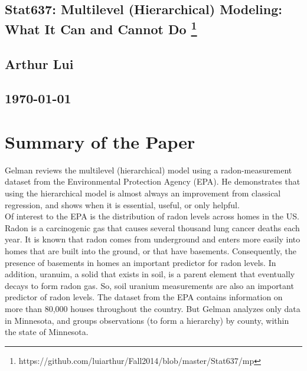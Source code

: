 \documentclass{article}
\begin{document}
\begin{center}
  \section*{\textbf{Stat637: Multilevel (Hierarchical) Modeling: What It Can and Cannot Do}
    \footnote{https://github.com/luiarthur/Fall2014/blob/master/Stat637/mp}
  }  
  \subsection*{\textbf{Arthur Lui}}
  \subsection*{\noindent\today}
\end{center}

\section{Summary of the Paper}
Gelman reviews the multilevel (hierarchical) model using a radon-measurement
dataset from the Environmental Protection Agency (EPA). He demonstrates that
using the hierarchical model is almost always an improvement from classical
regression, and shows when it is essential, useful, or only helpful.\\

\noindent
Of interest to the EPA is the distribution of radon levels across homes in the
US. Radon is a carcinogenic gas that causes several thousand lung cancer deaths
each year. It is known that radon comes from underground and enters more easily
into homes that are built into the ground, or that have basements.
Consequently, the presence of basements in homes an important predictor for
radon levels. In addition, uranuim, a solid that exists in soil, is a parent
element that eventually decays to form radon gas. So, soil uranium measurements
are also an important predictor of radon levels. The dataset from the EPA 
contains information on more than 80,000 houses throughout the country. But
Gelman analyzes only data in Minnesota, and groups observations (to form a
hierarchy) by county, within the state of Minnesota.\\
\end{document}

